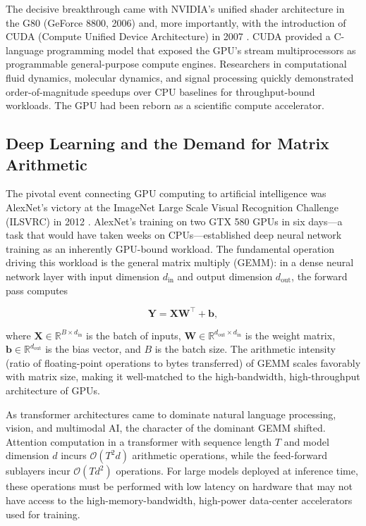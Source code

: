 \documentclass[conference]{IEEEtran}
\begin{document}
The decisive breakthrough came with NVIDIA's unified shader architecture in the G80 (GeForce 8800, 2006) and, more importantly, with the introduction of CUDA (Compute Unified Device Architecture) in 2007 \cite{nickolls2008scalable}. CUDA provided a C-language programming model that exposed the GPU's stream multiprocessors as programmable general-purpose compute engines. Researchers in computational fluid dynamics, molecular dynamics, and signal processing quickly demonstrated order-of-magnitude speedups over CPU baselines for throughput-bound workloads. The GPU had been reborn as a scientific compute accelerator.

\subsection{Deep Learning and the Demand for Matrix Arithmetic}

The pivotal event connecting GPU computing to artificial intelligence was AlexNet's victory at the ImageNet Large Scale Visual Recognition Challenge (ILSVRC) in 2012 \cite{krizhevsky2012imagenet}. AlexNet's training on two GTX 580 GPUs in six days---a task that would have taken weeks on CPUs---established deep neural network training as an inherently GPU-bound workload. The fundamental operation driving this workload is the general matrix multiply (GEMM): in a dense neural network layer with input dimension $d_\text{in}$ and output dimension $d_\text{out}$, the forward pass computes

\begin{equation}
\mathbf{Y} = \mathbf{X}\mathbf{W}^\top + \mathbf{b},
\label{eq:gemm}
\end{equation}

where $\mathbf{X} \in \mathbb{R}^{B \times d_\text{in}}$ is the batch of inputs, $\mathbf{W} \in \mathbb{R}^{d_\text{out} \times d_\text{in}}$ is the weight matrix, $\mathbf{b} \in \mathbb{R}^{d_\text{out}}$ is the bias vector, and $B$ is the batch size. The arithmetic intensity (ratio of floating-point operations to bytes transferred) of GEMM scales favorably with matrix size, making it well-matched to the high-bandwidth, high-throughput architecture of GPUs.

As transformer architectures \cite{vaswani2017attention} came to dominate natural language processing, vision, and multimodal AI, the character of the dominant GEMM shifted. Attention computation in a transformer with sequence length $T$ and model dimension $d$ incurs $\mathcal{O}(T^2 d)$ arithmetic operations, while the feed-forward sublayers incur $\mathcal{O}(T d^2)$ operations. For large models deployed at inference time, these operations must be performed with low latency on hardware that may not have access to the high-memory-bandwidth, high-power data-center accelerators used for training.
\end{document}
